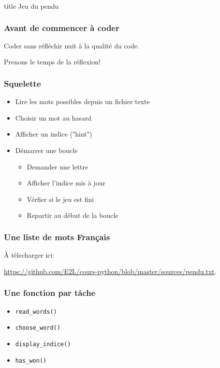 \documentclass{beamer}
\begin{document}
\begin{frame}[fragile]

  \begin{beamercolorbox}[sep=8pt,center,shadow=true,rounded=true]{title}
    Jeu du pendu
  \end{beamercolorbox}
\end{frame}


\begin{frame}[fragile]
  \frametitle{Avant de commencer à coder}

Coder sans réfléchir nuit à la qualité du code.

\vfill

Prenons le temps de la réflexion!
\end{frame}


\begin{frame}[fragile]
  \frametitle{Squelette}

\begin{itemize}
  \item Lire les mots possibles depuis un fichier texte
  \item Choisir un mot au hasard
  \item Afficher un indice ("hint")
  \item Démarrer une boucle
    \begin{itemize}
      \item Demander une lettre
      \item Afficher l'indice mis à jour
      \item Vérfier si le jeu est fini
      \item Repartir au début de la boucle
    \end{itemize}
\end{itemize}

\end{frame}

\begin{frame}[fragile]
  \frametitle{Une liste de mots Français}

À télecharger ici:

\url{https://github.com/E2L/cours-python/blob/master/sources/pendu.txt}.

\end{frame}



\begin{frame}[fragile]
  \frametitle{Une fonction par tâche}

\begin{itemize}
  \item \texttt{read\_words()}
  \item \texttt{choose\_word()}
  \item \texttt{display\_indice()}
  \item \texttt{has\_won()}
\end{itemize}

\end{frame}
\end{document}
